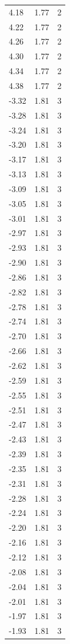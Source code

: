 \begin{longtable}{lrr}
  4.18 & 1.77 & 2 \\
  4.22 & 1.77 & 2 \\
  4.26 & 1.77 & 2 \\
  4.30 & 1.77 & 2 \\
  4.34 & 1.77 & 2 \\
  4.38 & 1.77 & 2 \\
  -3.32 & 1.81 & 3 \\
  -3.28 & 1.81 & 3 \\
  -3.24 & 1.81 & 3 \\
  -3.20 & 1.81 & 3 \\
  -3.17 & 1.81 & 3 \\
  -3.13 & 1.81 & 3 \\
  -3.09 & 1.81 & 3 \\
  -3.05 & 1.81 & 3 \\
  -3.01 & 1.81 & 3 \\
  -2.97 & 1.81 & 3 \\
  -2.93 & 1.81 & 3 \\
  -2.90 & 1.81 & 3 \\
  -2.86 & 1.81 & 3 \\
  -2.82 & 1.81 & 3 \\
  -2.78 & 1.81 & 3 \\
  -2.74 & 1.81 & 3 \\
  -2.70 & 1.81 & 3 \\
  -2.66 & 1.81 & 3 \\
  -2.62 & 1.81 & 3 \\
  -2.59 & 1.81 & 3 \\
  -2.55 & 1.81 & 3 \\
  -2.51 & 1.81 & 3 \\
  -2.47 & 1.81 & 3 \\
  -2.43 & 1.81 & 3 \\
  -2.39 & 1.81 & 3 \\
  -2.35 & 1.81 & 3 \\
  -2.31 & 1.81 & 3 \\
  -2.28 & 1.81 & 3 \\
  -2.24 & 1.81 & 3 \\
  -2.20 & 1.81 & 3 \\
  -2.16 & 1.81 & 3 \\
  -2.12 & 1.81 & 3 \\
  -2.08 & 1.81 & 3 \\
  -2.04 & 1.81 & 3 \\
  -2.01 & 1.81 & 3 \\
  -1.97 & 1.81 & 3 \\
  -1.93 & 1.81 & 3 \\

\end{longtable}
